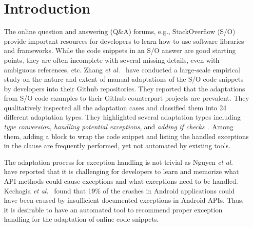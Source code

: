 \section{Introduction}
\label{sec:intro}

The online question and answering (Q\&A) forums, e.g., StackOverflow
(S/O) provide important resources for developers to learn how to use
software libraries and frameworks. While the code snippets in an S/O
answer are good starting points, they are often incomplete with
several missing details, even with ambiguous references, etc.  Zhang
{\em et al.}~\cite{zhang-icse19} have conducted a large-scale
empirical study on the nature and extent of manual adaptations of the
S/O code snippets by developers into their Github repositories.  They
reported that the adaptations from S/O code examples to their Github
counterpart projects are prevalent. They qualitatively inspected all
the adaptation cases and classified them into 24 different adaptation
types. They highlighted several adaptation types including {\em type
  conversion}, {\em handling potential exceptions}, and {\em adding if
  checks}~\cite{zhang-icse19}. Among them, adding a 
block to wrap the code snippet and listing the handled exceptions in
the  clause are frequently performed,
yet not automated by existing tools.

The adaptation process for exception handling is not trivial as Nguyen
{\em et al.}~\cite{xrank-fse20} have reported that it is challenging
for developers to learn and memorize what API methods could cause
exceptions and what exceptions need to be handled. Kechagia {\em et
  al.}~\cite{kechagia-msr14} found that 19\% of the crashes in Android
applications could have been caused by insufficient documented
exceptions in Android APIs. Thus, it is desirable to have an automated
tool to recommend proper exception handling for the adaptation of
online code snippets.

